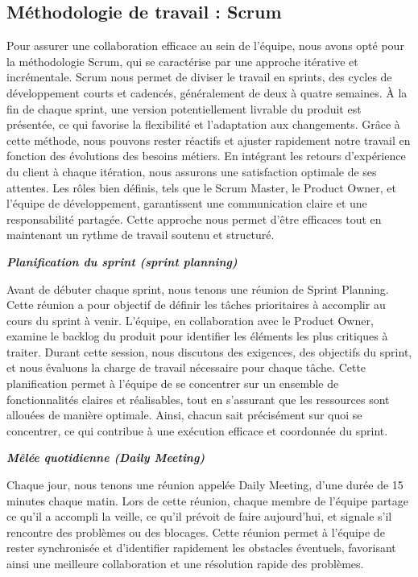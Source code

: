 \subsection{Méthodologie de travail : Scrum}

Pour assurer une collaboration efficace au sein de l'équipe, nous avons opté pour la méthodologie Scrum, qui se caractérise par une approche itérative et incrémentale. Scrum nous permet de diviser le travail en sprints, des cycles de développement courts et cadencés, généralement de deux à quatre semaines. À la fin de chaque sprint, une version potentiellement livrable du produit est présentée, ce qui favorise la flexibilité et l'adaptation aux changements. Grâce à cette méthode, nous pouvons rester réactifs et ajuster rapidement notre travail en fonction des évolutions des besoins métiers. En intégrant les retours d'expérience du client à chaque itération, nous assurons une satisfaction optimale de ses attentes. Les rôles bien définis, tels que le Scrum Master, le Product Owner, et l'équipe de développement, garantissent une communication claire et une responsabilité partagée. Cette approche nous permet d'être efficaces tout en maintenant un rythme de travail soutenu et structuré.


\textbf{\textbullet \textit{Planification du sprint (sprint planning)}}

Avant de débuter chaque sprint, nous tenons une réunion de Sprint Planning. Cette réunion a pour objectif de définir les tâches prioritaires à accomplir au cours du sprint à venir. L'équipe, en collaboration avec le Product Owner, examine le backlog du produit pour identifier les éléments les plus critiques à traiter. Durant cette session, nous discutons des exigences, des objectifs du sprint, et nous évaluons la charge de travail nécessaire pour chaque tâche. Cette planification permet à l'équipe de se concentrer sur un ensemble de fonctionnalités claires et réalisables, tout en s'assurant que les ressources sont allouées de manière optimale. Ainsi, chacun sait précisément sur quoi se concentrer, ce qui contribue à une exécution efficace et coordonnée du sprint.

\textbf{\textbullet \textit{Mêlée quotidienne (Daily Meeting)}}

Chaque jour, nous tenons une réunion appelée Daily Meeting, d'une durée de 15 minutes chaque matin. Lors de cette réunion, chaque membre de l'équipe partage ce qu'il a accompli la veille, ce qu'il prévoit de faire aujourd'hui, et signale s'il rencontre des problèmes ou des blocages. Cette réunion permet à l'équipe de rester synchronisée et d'identifier rapidement les obstacles éventuels, favorisant ainsi une meilleure collaboration et une résolution rapide des problèmes.

